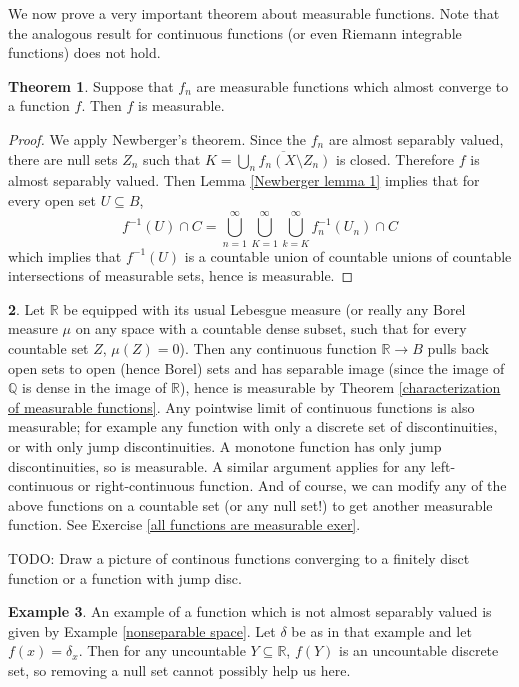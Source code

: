 \documentclass[12pt]{book}
\newcommand{\QQ}{\mathbb{Q}}
\newcommand{\RR}{\mathbb{R}}
\theoremstyle{definition}
\newtheorem{theorem}{Theorem}[section]
\newtheorem{subsec}[theorem]{}
\newtheorem{example}[theorem]{Example}
\begin{document}
We now prove a very important theorem about measurable functions. Note that the analogous result for continuous functions (or even Riemann integrable functions) does not hold.

\begin{theorem}
\label{measurable functions converge}
Suppose that $f_n$ are measurable functions which almost converge to a function $f$. Then $f$ is measurable.
\end{theorem}
\begin{proof}
We apply Newberger's theorem.
Since the $f_n$ are almost separably valued, there are null sets $Z_n$ such that $K = \overline{\bigcup_n f_n(X \setminus Z_n)}$ is closed.
Therefore $f$ is almost separably valued. Then Lemma \ref{Newberger lemma 1} implies that for every open set $U \subseteq B$,
$$f^{-1}(U) \cap C = \bigcup_{n=1}^\infty \bigcup_{K=1}^\infty \bigcup_{k=K}^\infty f_n^{-1}(U_n) \cap C$$
which implies that $f^{-1}(U)$ is a countable union of countable unions of countable intersections of measurable sets, hence is measurable.
\end{proof}

\begin{subsec}
\label{all functions are measurable}
Let $\RR$ be equipped with its usual Lebesgue measure (or really any Borel measure $\mu$ on any space with a countable dense subset, such that for every countable set $Z$, $\mu(Z) = 0$).
Then any continuous function $\RR \to B$ pulls back open sets to open (hence Borel) sets and has separable image (since the image of $\QQ$ is dense in the image of $\RR$), hence is measurable by Theorem \ref{characterization of measurable functions}.
Any pointwise limit of continuous functions is also measurable; for example any function with only a discrete set of discontinuities, or with only jump discontinuities.
A monotone function has only jump discontinuities, so is measurable. A similar argument applies for any left-continuous or right-continuous function.
And of course, we can modify any of the above functions on a countable set (or any null set!) to get another measurable function.
See Exercise \ref{all functions are measurable exer}.

TODO: Draw a picture of continous functions converging to a finitely disct function or a function with jump disc.
\end{subsec}

\begin{example}
\label{nonseparable function}
An example of a function which is not almost separably valued is given by Example \ref{nonseparable space}.
Let $\delta$ be as in that example and let $f(x) = \delta_x$. Then for any uncountable $Y \subseteq \RR$, $f(Y)$ is an uncountable discrete set, so removing a null set cannot possibly help us here.
\end{example}
\end{document}
